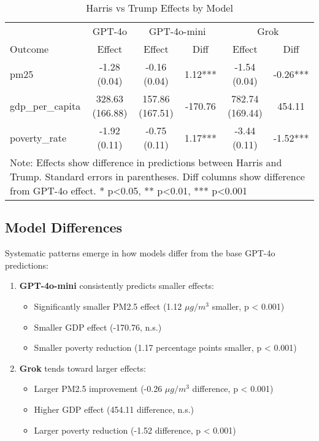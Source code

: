 \begin{table}[htbp]
    \centering
    \caption{Harris vs Trump Effects by Model}
    \begin{tabular}{lccccc}
    \hline
    & \multicolumn{1}{c}{GPT-4o} & \multicolumn{2}{c}{GPT-4o-mini} & \multicolumn{2}{c}{Grok} \\
    Outcome & Effect & Effect & Diff & Effect & Diff \\
    \hline
    pm25 & -1.28 (0.04) & -0.16 (0.04) & 1.12*** & -1.54 (0.04) & -0.26*** \\
    gdp\_per\_capita & 328.63 (166.88) & 157.86 (167.51) & -170.76 & 782.74 (169.44) & 454.11 \\
    poverty\_rate & -1.92 (0.11) & -0.75 (0.11) & 1.17*** & -3.44 (0.11) & -1.52*** \\
    \hline
    \multicolumn{6}{p{0.95\textwidth}}{\small Note: Effects show difference in predictions between Harris and Trump. 
    Standard errors in parentheses. Diff columns show difference from GPT-4o effect. * p<0.05, ** p<0.01, *** p<0.001} \\
    \end{tabular}
    \label{tab:model_comparison}
\end{table}

\subsection{Model Differences}

Systematic patterns emerge in how models differ from the base GPT-4o predictions:

\begin{enumerate}
    \item \textbf{GPT-4o-mini} consistently predicts smaller effects:
    \begin{itemize}
        \item Significantly smaller PM2.5 effect (1.12 $\mu g/m^3$ smaller, p < 0.001)
        \item Smaller GDP effect (-170.76, n.s.)
        \item Smaller poverty reduction (1.17 percentage points smaller, p < 0.001)
    \end{itemize}

    \item \textbf{Grok} tends toward larger effects:
    \begin{itemize}
        \item Larger PM2.5 improvement (-0.26 $\mu g/m^3$ difference, p < 0.001)
        \item Higher GDP effect (454.11 difference, n.s.)
        \item Larger poverty reduction (-1.52 difference, p < 0.001)
    \end{itemize}
\end{enumerate}

